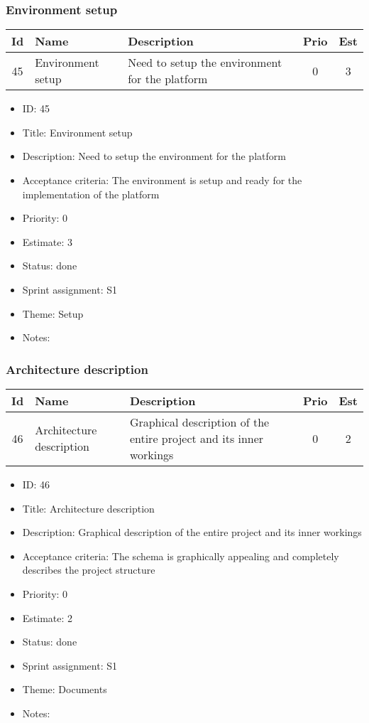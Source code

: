 \newpage
\subsubsection{Environment setup}
\begin{tabular}{|c|m{2cm}|m{4cm}|c|c|}
	\hline
	\textbf{Id}&\textbf{Name}&\textbf{Description}&\textbf{Prio}&\textbf{Est}\\
	\hline
	45 & Environment setup & 
	Need to setup the environment for the platform &
	0 & 3 \\
	\hline
\end{tabular}
\begin{itemize}
	\item ID: 45
	\item Title: Environment setup
	\item Description: Need to setup the environment for the platform
	\item Acceptance criteria: The environment is setup and ready for the implementation of the platform
	\item Priority: 0
	\item Estimate: 3
	\item Status: done
	\item Sprint assignment: S1
	\item Theme: Setup
	\item Notes:
\end{itemize}

\newpage
\subsubsection{Architecture description}
\begin{tabular}{|c|m{2cm}|m{4cm}|c|c|}
	\hline
	\textbf{Id}&\textbf{Name}&\textbf{Description}&\textbf{Prio}&\textbf{Est}\\
	\hline
	46 & Architecture description & 
	Graphical description of the entire project and its inner workings &
	0 & 2 \\
	\hline
\end{tabular}
\begin{itemize}
	\item ID: 46
	\item Title: Architecture description
	\item Description: Graphical description of the entire project and its inner workings
	\item Acceptance criteria: The schema is graphically appealing and completely describes the project structure
	\item Priority: 0
	\item Estimate: 2
	\item Status: done
	\item Sprint assignment: S1
	\item Theme: Documents
	\item Notes:
\end{itemize}

